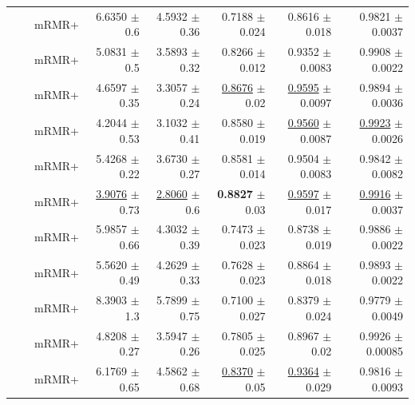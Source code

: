 \begin{longtable}{llp{}rrrrr}
 &  & mRMR+ & 6.6350 {\scriptsize $\pm$ 0.6} & 4.5932 {\scriptsize $\pm$ 0.36} & 0.7188 {\scriptsize $\pm$ 0.024} & 0.8616 {\scriptsize $\pm$ 0.018} & 0.9821 {\scriptsize $\pm$ 0.0037} \\
 &  & mRMR+ & 5.0831 {\scriptsize $\pm$ 0.5} & 3.5893 {\scriptsize $\pm$ 0.32} & 0.8266 {\scriptsize $\pm$ 0.012} & 0.9352 {\scriptsize $\pm$ 0.0083} & 0.9908 {\scriptsize $\pm$ 0.0022} \\
 &  & mRMR+ & 4.6597 {\scriptsize $\pm$ 0.35} & 3.3057 {\scriptsize $\pm$ 0.24} & \underline{0.8676} {\scriptsize $\pm$ 0.02} & \underline{0.9595} {\scriptsize $\pm$ 0.0097} & 0.9894 {\scriptsize $\pm$ 0.0036} \\
 &  & mRMR+ & 4.2044 {\scriptsize $\pm$ 0.53} & 3.1032 {\scriptsize $\pm$ 0.41} & 0.8580 {\scriptsize $\pm$ 0.019} & \underline{0.9560} {\scriptsize $\pm$ 0.0087} & \underline{0.9923} {\scriptsize $\pm$ 0.0026} \\
 &  & mRMR+ & 5.4268 {\scriptsize $\pm$ 0.22} & 3.6730 {\scriptsize $\pm$ 0.27} & 0.8581 {\scriptsize $\pm$ 0.014} & 0.9504 {\scriptsize $\pm$ 0.0083} & 0.9842 {\scriptsize $\pm$ 0.0082} \\
 &  & mRMR+ & \underline{3.9076} {\scriptsize $\pm$ 0.73} & \underline{2.8060} {\scriptsize $\pm$ 0.6} & \textbf{0.8827} {\scriptsize $\pm$ 0.03} & \underline{0.9597} {\scriptsize $\pm$ 0.017} & \underline{0.9916} {\scriptsize $\pm$ 0.0037} \\
 &  & mRMR+ & 5.9857 {\scriptsize $\pm$ 0.66} & 4.3032 {\scriptsize $\pm$ 0.39} & 0.7473 {\scriptsize $\pm$ 0.023} & 0.8738 {\scriptsize $\pm$ 0.019} & 0.9886 {\scriptsize $\pm$ 0.0022} \\
 &  & mRMR+ & 5.5620 {\scriptsize $\pm$ 0.49} & 4.2629 {\scriptsize $\pm$ 0.33} & 0.7628 {\scriptsize $\pm$ 0.023} & 0.8864 {\scriptsize $\pm$ 0.018} & 0.9893 {\scriptsize $\pm$ 0.0022} \\
 &  & mRMR+ & 8.3903 {\scriptsize $\pm$ 1.3} & 5.7899 {\scriptsize $\pm$ 0.75} & 0.7100 {\scriptsize $\pm$ 0.027} & 0.8379 {\scriptsize $\pm$ 0.024} & 0.9779 {\scriptsize $\pm$ 0.0049} \\
 &  & mRMR+ & 4.8208 {\scriptsize $\pm$ 0.27} & 3.5947 {\scriptsize $\pm$ 0.26} & 0.7805 {\scriptsize $\pm$ 0.025} & 0.8967 {\scriptsize $\pm$ 0.02} & 0.9926 {\scriptsize $\pm$ 0.00085} \\
 &  & mRMR+ & 6.1769 {\scriptsize $\pm$ 0.65} & 4.5862 {\scriptsize $\pm$ 0.68} & \underline{0.8370} {\scriptsize $\pm$ 0.05} & \underline{0.9364} {\scriptsize $\pm$ 0.029} & 0.9816 {\scriptsize $\pm$ 0.0093} \\

\end{longtable}
